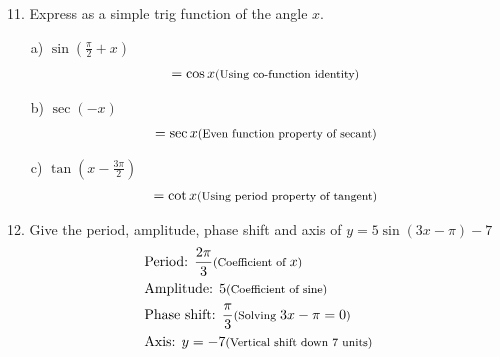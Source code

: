 \documentclass{article}
\newenvironment{solution}{\color{solutioncolor}}{}
\newcommand{\smalltext}[1]{\text{\footnotesize #1}}
\begin{document}
11. Express as a simple trig function of the angle \( x \).
\begin{enumerate}
    \item[a)] \( \sin \left(\frac{\pi}{2} + x\right) \)
    \begin{solution}
        \begin{align*}
            &= \cos x \smalltext{ (Using co-function identity)}
        \end{align*}
    \end{solution}
    \item[b)] \( \sec(-x) \)
    \begin{solution}
        \begin{align*}
            &= \sec x \smalltext{ (Even function property of secant)}
        \end{align*}
    \end{solution}
    \item[c)] \( \tan \left(x - \frac{3\pi}{2}\right) \)
    \begin{solution}
        \begin{align*}
            &= \cot x \smalltext{ (Using period property of tangent)}
        \end{align*}
    \end{solution}
\end{enumerate}

12. Give the period, amplitude, phase shift and axis of \( y = 5\sin(3x - \pi) - 7 \)
\begin{solution}
\begin{align*}
    &\text{Period: } \frac{2\pi}{3} \smalltext{ (Coefficient of } x \smalltext{)} \\
    &\text{Amplitude: } 5 \smalltext{ (Coefficient of sine)} \\
    &\text{Phase shift: } \frac{\pi}{3} \smalltext{ (Solving } 3x - \pi = 0 \smalltext{)} \\
    &\text{Axis: } y = -7 \smalltext{ (Vertical shift down 7 units)}
\end{align*}
\end{solution}
\end{document}
